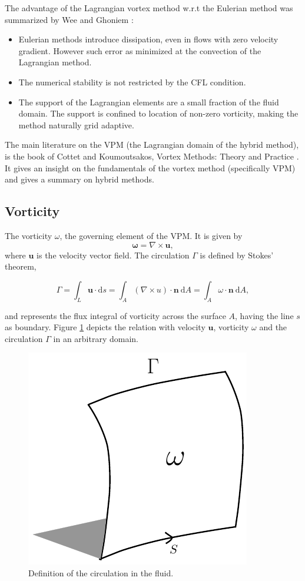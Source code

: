 The advantage of the Lagrangian vortex method w.r.t the Eulerian method was summarized by Wee and Ghoniem \cite{Wee2006a}:
\begin{itemize}
\item Eulerian methods introduce dissipation, even in flows with zero velocity gradient. However such error as minimized at the convection of the Lagrangian method.
\item The numerical stability is not restricted by the CFL condition.
\item The support of the Lagrangian elements are a small fraction of the fluid domain. The support is confined to location of non-zero vorticity, making the method naturally grid adaptive.
\end{itemize}

The main literature on the VPM (the Lagrangian domain of the hybrid method), is the book of Cottet and Koumoutsakos, Vortex Methods: Theory and Practice \cite{Cottet2000a}. It gives an insight on the fundamentals of the vortex method (specifically VPM) and gives a summary on hybrid methods.

\subsection{Vorticity}
The vorticity $\omega$, the governing element of the VPM. It is given by
	\begin{equation}
	\mathbf{\omega} = \nabla \times \mathbf{u},
	\label{eq:lag_vort}
	\end{equation}
where $\mathbf{u}$ is the velocity vector field. The circulation $\Gamma$ is defined by Stokes' theorem,

	\begin{equation}
	\Gamma = \int_L\mathbf{u}\cdot \mathrm{d}s= \int_A (\nabla \times u) \cdot \mathbf{n}\ \mathrm{d}A = \int_A\omega\cdot\mathbf{n}\ \mathrm{d}A,
	\label{eq:definitionOfCirculation}
	\end{equation}

and represents the flux integral of vorticity across the surface $A$, having the line $s$ as boundary. Figure \ref{fig:vorticityCirculation} depicts the relation with velocity $\mathbf{u}$, vorticity $\omega$ and the circulation $\Gamma$ in an arbitrary domain.

	\begin{figure}[!h]
	\centering
	\includegraphics[width=0.3\linewidth]{./figures/lagrangian/vorticityCirculation_updated.pdf}
	\caption{Definition of the circulation in the fluid.}
	\label{fig:vorticityCirculation}
	\end{figure}

